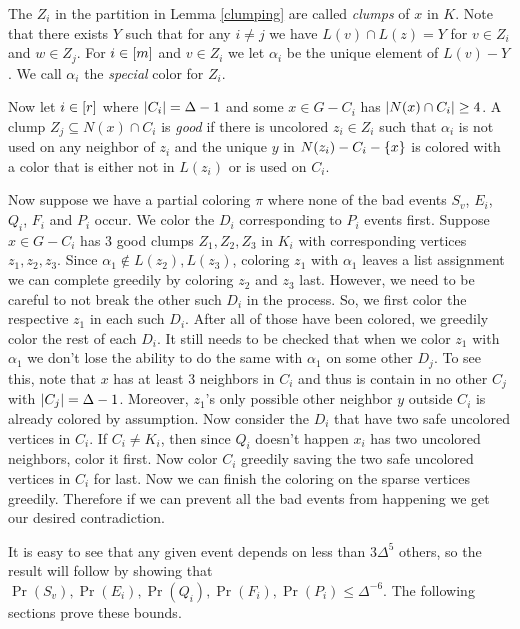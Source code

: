 The $Z_i$ in the partition in Lemma \ref{clumping} are called \emph{clumps} of $x$ in $K$.
Note that there exists $Y$ such that for any $i \neq j$ we have $L(v) \cap L(z)
= Y$ for $v \in Z_i$ and $w \in Z_j$.  For $i \in \left[m\right]$ and $v \in Z_i$ we
let $\alpha_i$ be the unique element of $L(v) - Y$.  We call $\alpha_i$ the
\emph{special} color for $Z_i$.

Now let $i \in \left[r\right]$ where $\left|C_i\right| = \Delta - 1$ and some $x \in G -
C_i$ has $\left|N(x) \cap C_i\right| \geq 4$. A clump $Z_j \subseteq
N(x) \cap C_i$ is \emph{good} if there is uncolored $z_i \in Z_i$ such that
$\alpha_i$ is not used on any neighbor of $z_i$ and the unique $y$ in $N(z_i) - C_i - \left\{ x \right\}$ is colored with a color that is
either not in $L(z_i)$ or is used on $C_i$.

Now suppose we have a partial coloring $\pi$ where none of the bad events $S_v$,
$E_i$, $Q_i$, $F_i$ and $P_i$ occur.  We color the $D_i$ corresponding to $P_i$
events first.  Suppose $x \in G - C_i$ has $3$ good clumps $Z_1, Z_2, Z_3$ in $K_i$ with
corresponding vertices $z_1, z_2, z_3$.  Since $\alpha_1 \not \in L(z_2),
L(z_3)$, coloring $z_1$ with $\alpha_1$ leaves a list assignment we can complete
greedily by coloring $z_2$ and $z_3$ last.  However, we need to be careful
to not break the other such $D_i$ in the process.  So, we first color the
respective $z_1$ in each such $D_i$.  After all of those have been colored, we
greedily color the rest of each $D_i$.  
It still needs to be checked that when we color $z_1$ with $\alpha_1$ we don't lose the ability to do the same 
with $\alpha_1$ on some other $D_j$. To see this, note that $x$ has at least $3$ neighbors in $C_i$ and thus is 
contain in no other $C_j$ with $\left|C_j\right| = \Delta-1$.  Moreover, $z_1$'s only
possible other neighbor $y$ outside $C_i$ is already colored by assumption. 
Now consider the $D_i$ that have two safe uncolored vertices in $C_i$.  If $C_i
\neq K_i$, then since $Q_i$ doesn't happen $x_i$ has two uncolored neighbors,
color it first.  Now color $C_i$ greedily saving the two safe uncolored vertices
in $C_i$ for last. Now we can finish the coloring on the sparse vertices greedily. 
Therefore if we can prevent all the bad events from happening we get our desired contradiction.

It is easy to see that any given event depends on less than $3\Delta^5$ others,
so the result will follow by showing that $\Pr(S_v), \Pr(E_i), \Pr(Q_i),
\Pr(F_i),\Pr(P_i) \leq \Delta^{-6}$.  The following sections prove these bounds.

